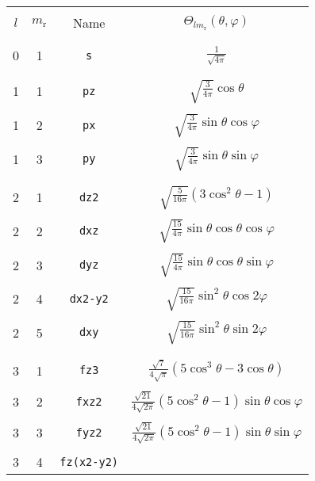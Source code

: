 \begin{table}
\begin{center}
\begin{tabular}{|cccc|}
\hline\hline
&&&\\
$l$ & $m_{\mathrm{r}}$ & Name & $\Theta_{lm_{\mathrm{r}}}(\theta,\varphi)$ \\
&&&\\\hline&&&\\
 0  &  1  &  \verb#s#   & $\frac{1}{\sqrt{4\pi}}$ \\
&&&\\\hline&&&\\
 1  &  1  &  \verb#pz#  & $\sqrt{\frac{3}{4\pi}}\cos\theta$ \\
&&&\\
 1  &  2  &  \verb#px#  & $\sqrt{\frac{3}{4\pi}}\sin\theta\cos\varphi$ \\
&&&\\
 1  &  3  &  \verb#py#  & $\sqrt{\frac{3}{4\pi}}\sin\theta\sin\varphi$ \\
&&&\\\hline&&&\\
 2  &  1  &  \verb#dz2# &
$\sqrt{\frac{5}{16\pi}}(3\cos^{2}\theta -1)$ \\
&&&\\
 2  &  2  &  \verb#dxz# &
$\sqrt{\frac{15}{4\pi}}\sin\theta\cos\theta\cos\varphi$ \\
&&&\\
 2  &  3  &  \verb#dyz# &
$\sqrt{\frac{15}{4\pi}}\sin\theta\cos\theta\sin\varphi$ \\
&&&\\
 2  &  4  &  \verb#dx2-y2# &
$\sqrt{\frac{15}{16\pi}}\sin^{2}\theta\cos2\varphi$ \\
&&&\\
 2  &  5  &  \verb#dxy# &
$\sqrt{\frac{15}{16\pi}}\sin^{2}\theta\sin2\varphi$ \\
&&&\\\hline&&&\\
 3  &  1  &  \verb#fz3# &
$\frac{\sqrt{7}}{4\sqrt{\pi}}(5\cos^{3}\theta-3\cos\theta)$ \\
&&&\\
 3  &  2  &  \verb#fxz2# &
$\frac{\sqrt{21}}{4\sqrt{2\pi}}(5\cos^{2}\theta-1)\sin\theta\cos\varphi$\\
&&&\\
 3  &  3  &  \verb#fyz2# &
$\frac{\sqrt{21}}{4\sqrt{2\pi}}(5\cos^{2}\theta-1)\sin\theta\sin\varphi$\\
&&&\\
 3  &  4  &  \verb#fz(x2-y2)# &

\end{tabular}
\end{center}
\end{table}
